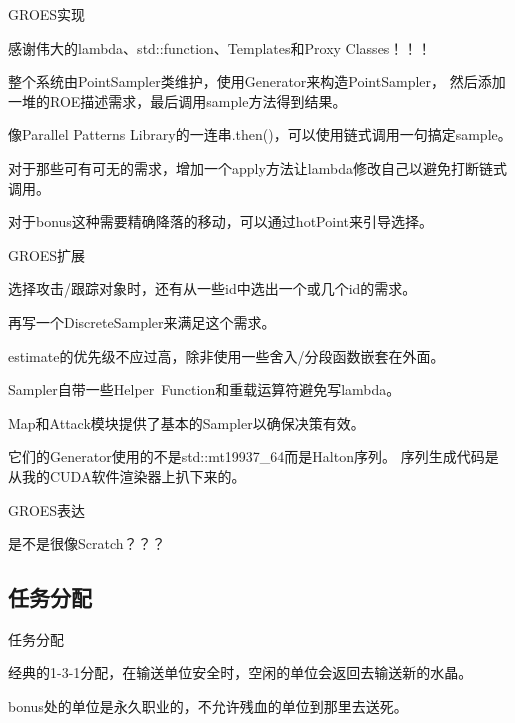 \documentclass[aspectratio=43,compress]{beamer}
\begin{document}
\begin{frame}{GROES实现}
\begin{card}
感谢伟大的lambda、std::function、Templates和Proxy Classes！！！

整个系统由PointSampler类维护，使用Generator来构造PointSampler，
然后添加一堆的ROE描述需求，最后调用sample方法得到结果。

像Parallel Patterns Library的一连串.then()，可以使用链式调用一句搞定sample。

对于那些可有可无的需求，增加一个apply方法让lambda修改自己以避免打断链式调用。

对于bonus这种需要精确降落的移动，可以通过hotPoint来引导选择。
\end{card}
\end{frame}

\begin{frame}{GROES扩展}
\begin{cardTiny}
选择攻击/跟踪对象时，还有从一些id中选出一个或几个id的需求。

再写一个DiscreteSampler来满足这个需求。
\end{cardTiny}
\begin{cardTiny}
estimate的优先级不应过高，除非使用一些舍入/分段函数嵌套在外面。

Sampler自带一些Helper~Function和重载运算符避免写lambda。

Map和Attack模块提供了基本的Sampler以确保决策有效。

它们的Generator使用的不是std::mt19937\_64而是Halton序列。
序列生成代码是从我的CUDA软件渲染器上扒下来的。
\end{cardTiny}
\end{frame}

\begin{frame}{GROES表达}
\begin{cardTiny}
是不是很像Scratch？？？
\end{cardTiny}
\centering
{}
\end{frame}
\subsection{任务分配}
\begin{frame}{任务分配}
\begin{card}
经典的1-3-1分配，在输送单位安全时，空闲的单位会返回去输送新的水晶。

bonus处的单位是永久职业的，不允许残血的单位到那里去送死。
\end{card}
\end{frame}
\end{document}

